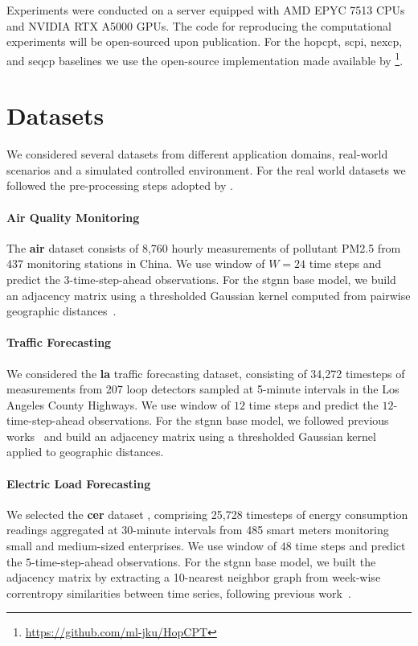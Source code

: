 Experiments were conducted on a server equipped with AMD EPYC 7513 CPUs and NVIDIA RTX A5000 GPUs. The code for reproducing the computational experiments will be open-sourced upon publication. For the \gls{hopcpt}, \gls{scpi}, \gls{nexcp}, and \gls{seqcp} baselines we use the open-source implementation made available by \citet{auer2023conformal}\footnote{\url{https://github.com/ml-jku/HopCPT}}. 

\section{Datasets}\label{a:datasets}

We considered several datasets from different application domains, real-world scenarios and a simulated controlled environment. For the real world datasets we followed the pre-processing steps adopted by \citet{cini2023taming}.

\paragraph{Air Quality Monitoring} The \textbf{\gls{air}} \cite{zheng2015forecasting} dataset consists of 8,760 hourly measurements of pollutant PM2.5 from 437 monitoring stations in China. We use window of $W=24$ time steps and predict the $3$-time-step-ahead observations. For the \gls{stgnn} base model, we build an adjacency matrix using a thresholded Gaussian kernel computed from pairwise geographic distances~\cite{shuman2013emerging}.

\paragraph{Traffic Forecasting} We considered the \textbf{\gls{la}} \cite{li2018diffusion} traffic forecasting dataset, consisting of 34,272 timesteps of measurements from 207 loop detectors sampled at 5-minute intervals in the Los Angeles County Highways. We use window of $12$ time steps and predict the $12$-time-step-ahead observations. For the \gls{stgnn} base model, we followed previous works~\cite{wu2019graph} and build an adjacency matrix using a thresholded Gaussian kernel applied to geographic distances.

\paragraph{Electric Load Forecasting} We selected the \textbf{\gls{cer}} dataset \cite{cer2016cer, cini2022filling}, comprising 25,728 timesteps of energy consumption readings aggregated at 30-minute intervals from 485 smart meters monitoring small and medium-sized enterprises. We use window of $48$ time steps and predict the $5$-time-step-ahead observations. For the \gls{stgnn} base model, we built the adjacency matrix by extracting a 10-nearest neighbor graph from week-wise correntropy similarities between time series, following previous work~\cite{cini2022filling}.

